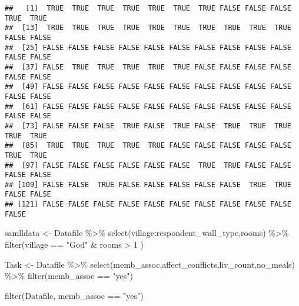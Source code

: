 \documentclass[
]{article}
\newenvironment{Shaded}{\begin{snugshade}}{\end{snugshade}}
\newcommand{\DecValTok}[1]{\textcolor[rgb]{0.00,0.00,0.81}{#1}}
\newcommand{\FunctionTok}[1]{\textcolor[rgb]{0.00,0.00,0.00}{#1}}
\newcommand{\NormalTok}[1]{#1}
\newcommand{\OtherTok}[1]{\textcolor[rgb]{0.56,0.35,0.01}{#1}}
\newcommand{\SpecialCharTok}[1]{\textcolor[rgb]{0.00,0.00,0.00}{#1}}
\newcommand{\StringTok}[1]{\textcolor[rgb]{0.31,0.60,0.02}{#1}}
\begin{document}
\begin{verbatim}
##   [1]  TRUE  TRUE  TRUE  TRUE  TRUE  TRUE  TRUE FALSE FALSE FALSE  TRUE  TRUE
##  [13]  TRUE  TRUE  TRUE  TRUE  TRUE  TRUE  TRUE  TRUE  TRUE  TRUE FALSE FALSE
##  [25] FALSE FALSE FALSE FALSE FALSE FALSE FALSE FALSE FALSE FALSE FALSE FALSE
##  [37] FALSE  TRUE  TRUE  TRUE  TRUE  TRUE FALSE FALSE FALSE FALSE FALSE FALSE
##  [49] FALSE FALSE FALSE FALSE FALSE FALSE FALSE FALSE FALSE FALSE FALSE FALSE
##  [61] FALSE FALSE FALSE FALSE FALSE FALSE FALSE FALSE FALSE FALSE FALSE FALSE
##  [73] FALSE FALSE FALSE  TRUE FALSE  TRUE FALSE  TRUE  TRUE  TRUE  TRUE  TRUE
##  [85]  TRUE  TRUE  TRUE  TRUE  TRUE FALSE FALSE FALSE FALSE FALSE  TRUE  TRUE
##  [97] FALSE FALSE FALSE FALSE FALSE FALSE  TRUE  TRUE FALSE FALSE FALSE FALSE
## [109] FALSE FALSE  TRUE FALSE FALSE FALSE FALSE FALSE  TRUE  TRUE FALSE FALSE
## [121] FALSE FALSE FALSE FALSE FALSE FALSE FALSE FALSE FALSE FALSE FALSE
\end{verbatim}

\begin{Shaded}
\begin{Highlighting}[]
\NormalTok{samlldata }\OtherTok{\textless{}{-}}\NormalTok{ Datafile }\SpecialCharTok{\%\textgreater{}\%} 
  \FunctionTok{select}\NormalTok{(village}\SpecialCharTok{:}\NormalTok{respondent\_wall\_type,rooms) }\SpecialCharTok{\%\textgreater{}\%} 
  \FunctionTok{filter}\NormalTok{(village }\SpecialCharTok{==} \StringTok{"God"} \SpecialCharTok{\&}\NormalTok{ rooms }\SpecialCharTok{\textgreater{}} \DecValTok{1}\NormalTok{ )}


\NormalTok{Task }\OtherTok{\textless{}{-}}\NormalTok{ Datafile }\SpecialCharTok{\%\textgreater{}\%} 
  \FunctionTok{select}\NormalTok{(memb\_assoc,affect\_conflicts,liv\_count,no\_meals) }\SpecialCharTok{\%\textgreater{}\%} 
  \FunctionTok{filter}\NormalTok{(memb\_assoc }\SpecialCharTok{==} \StringTok{"yes"}\NormalTok{)}

\FunctionTok{filter}\NormalTok{(Datafile, memb\_assoc }\SpecialCharTok{==} \StringTok{"yes"}\NormalTok{)}
\end{Highlighting}
\end{Shaded}
\end{document}
